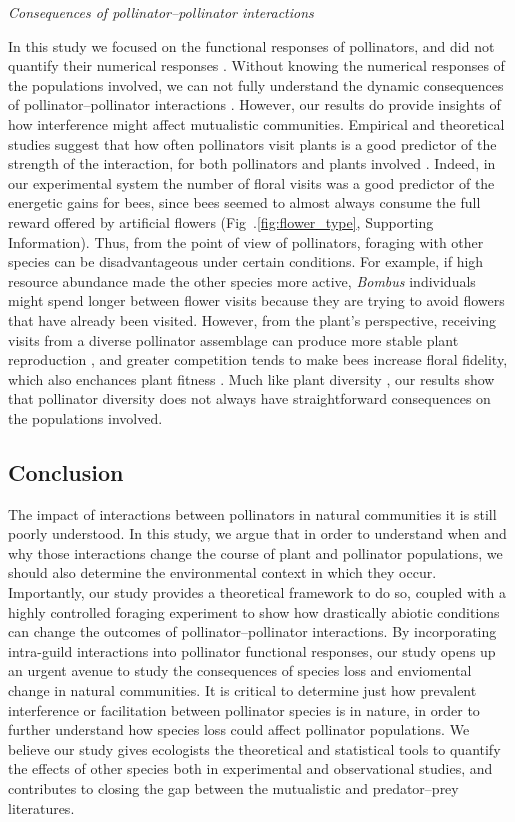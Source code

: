 \begin{refsection}
\textit{Consequences of pollinator--pollinator interactions}

In this study we focused on the functional responses of pollinators, and did not quantify their numerical responses \citep{morris_benefit_2010}. Without knowing the numerical responses of the populations involved, we can not fully understand the dynamic consequences of pollinator--pollinator interactions \citep{revilla2015numerical}. However, our results do provide insights of how interference might affect mutualistic communities. Empirical and theoretical studies suggest that how often pollinators visit plants is a good predictor of the strength of the interaction, for both pollinators and plants involved \citep{vazquez_interaction_2005,vazquez_strength_2012}. Indeed, in our experimental system the number of floral visits was a good predictor of the energetic gains for bees, since bees seemed to almost always consume the full reward offered by artificial flowers (Fig~.\ref{fig:flower_type}, Supporting Information). Thus, from the point of view of pollinators, foraging with other species can be disadvantageous under certain conditions. For example, if high resource abundance made the other species more active, \textit{Bombus} individuals might spend longer between flower visits because they are trying to avoid flowers that have already been visited. However, from the plant's perspective, receiving visits from a diverse pollinator assemblage can produce more stable plant reproduction \citep{sahli2006characterizing}, and greater competition tends to make bees increase floral fidelity, which also enchances plant fitness \citep{brosi_single_2013}. Much like plant diversity \citep{bruninga2016role}, our results show that pollinator diversity does not always have straightforward consequences on the populations involved.


\subsection*{Conclusion}

The impact of interactions between pollinators in natural communities it is still poorly understood. In this study, we argue that in order to understand when and why those interactions change the course of plant and pollinator populations, we should also determine the environmental context in which they occur. Importantly, our study provides a theoretical framework to do so, coupled with a highly controlled foraging experiment to show how drastically abiotic conditions can change the outcomes of pollinator--pollinator interactions. By incorporating intra-guild interactions into pollinator functional responses, our study opens up an urgent avenue to study the consequences of species loss and enviomental change in natural communities. It is critical to determine just how prevalent interference or facilitation between pollinator species is in nature, in order to further understand how species loss could affect pollinator populations. We believe our study gives ecologists the theoretical and statistical tools to quantify the effects of other species both in experimental and observational studies, and contributes to closing the gap between the mutualistic and predator--prey literatures.



\end{refsection}
